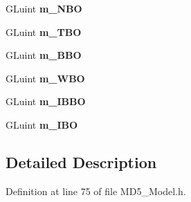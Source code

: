 \begin{DoxyCompactItemize}
\item 
G\+Luint {\bfseries m\+\_\+\+N\+BO}\hypertarget{struct_m_d5_model_1_1_mesh_adcabe263f86ef10b29abac98c230879c}{}\label{struct_m_d5_model_1_1_mesh_adcabe263f86ef10b29abac98c230879c}

\item 
G\+Luint {\bfseries m\+\_\+\+T\+BO}\hypertarget{struct_m_d5_model_1_1_mesh_a2533ac25e8c08252eb92539b5fe2b777}{}\label{struct_m_d5_model_1_1_mesh_a2533ac25e8c08252eb92539b5fe2b777}

\item 
G\+Luint {\bfseries m\+\_\+\+B\+BO}\hypertarget{struct_m_d5_model_1_1_mesh_a235863a1864172bb0e9f4d105f60b08b}{}\label{struct_m_d5_model_1_1_mesh_a235863a1864172bb0e9f4d105f60b08b}

\item 
G\+Luint {\bfseries m\+\_\+\+W\+BO}\hypertarget{struct_m_d5_model_1_1_mesh_ab2946e8f6ef57204414c39a9e4a116db}{}\label{struct_m_d5_model_1_1_mesh_ab2946e8f6ef57204414c39a9e4a116db}

\item 
G\+Luint {\bfseries m\+\_\+\+I\+B\+BO}\hypertarget{struct_m_d5_model_1_1_mesh_a95b8afff402e6d310a8c967da1d08f12}{}\label{struct_m_d5_model_1_1_mesh_a95b8afff402e6d310a8c967da1d08f12}

\item 
G\+Luint {\bfseries m\+\_\+\+I\+BO}\hypertarget{struct_m_d5_model_1_1_mesh_ac2fdb4848bfa44fa2b0d1c0636412d82}{}\label{struct_m_d5_model_1_1_mesh_ac2fdb4848bfa44fa2b0d1c0636412d82}

\end{DoxyCompactItemize}


\subsection{Detailed Description}


Definition at line 75 of file M\+D5\+\_\+\+Model.\+h.

